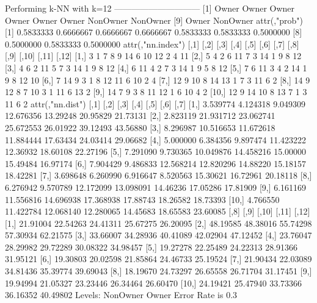 \documentclass{article}
\begin{document}
\begin{Schunk}
\begin{Soutput}
Performing k-NN with k=12
 ------------------------------
 [1] Owner    Owner    Owner    Owner    Owner    Owner    NonOwner NonOwner
 [9] Owner    NonOwner
attr(,"prob")
 [1] 0.5833333 0.6666667 0.6666667 0.6666667 0.5833333 0.5833333 0.5000000
 [8] 0.5000000 0.5833333 0.5000000
attr(,"nn.index")
      [,1] [,2] [,3] [,4] [,5] [,6] [,7] [,8] [,9] [,10] [,11] [,12]
 [1,]    3    1    7    8    9   14    6   10   12     2     4    11
 [2,]    5    4    2    6   11    7    3   14    1     9     8    12
 [3,]    4    6    2   11    5    7    3   14    1     9     8    12
 [4,]    6   11    4    2    7    3   14    1    9     5     8    12
 [5,]    7    6   11    3    4    2   14    1    9     8    12    10
 [6,]    7   14    9    3    1    8   12   11    6    10     2     4
 [7,]   12    9   10    8   14   13    1    7    3    11     6     2
 [8,]   14    9   12    8    7   10    3    1   11     6    13     2
 [9,]   14    7    9    3    8   11   12    1    6    10     4     2
[10,]   12    9   14   10    8   13    7    1    3    11     6     2
attr(,"nn.dist")
          [,1]      [,2]      [,3]      [,4]     [,5]     [,6]     [,7]
 [1,] 3.539774  4.124318  9.049309 12.676356 13.29248 20.95829 21.73131
 [2,] 2.823119 21.931712 23.062741 25.672553 26.01922 39.12493 43.56880
 [3,] 8.296987 10.516653 11.672618 11.884444 17.63434 24.03414 29.06682
 [4,] 5.000000  6.384356  9.897474 11.423222 12.36932 18.60108 22.27196
 [5,] 7.291090  9.730365 10.049876 14.458216 15.00000 15.49484 16.97174
 [6,] 7.904429  9.486833 12.568214 12.820296 14.88220 15.18157 18.42281
 [7,] 3.698648  6.260990  6.916647  8.520563 15.30621 16.72961 20.18118
 [8,] 6.276942  9.570789 12.172099 13.098091 14.46236 17.05286 17.81909
 [9,] 6.161169 11.556816 14.696938 17.368938 17.88743 18.26582 18.73393
[10,] 4.766550 11.422784 12.068140 12.280065 14.45683 18.65583 23.60085
          [,8]     [,9]    [,10]    [,11]    [,12]
 [1,] 21.91004 22.54263 24.41311 25.67275 26.20095
 [2,] 48.19585 48.38016 55.74298 57.30934 62.21575
 [3,] 33.66007 34.28936 40.41089 42.02904 47.12452
 [4,] 23.76047 28.29982 29.72289 30.08322 34.98457
 [5,] 19.27278 22.25489 24.22313 28.91366 31.95121
 [6,] 19.30803 20.02598 21.85864 24.46733 25.19524
 [7,] 21.90434 22.03089 34.81436 35.39774 39.69043
 [8,] 18.19670 24.73297 26.65558 26.71704 31.17451
 [9,] 19.94994 21.05327 23.23446 26.34464 26.60470
[10,] 24.19421 25.47940 33.73366 36.16352 40.49802
Levels: NonOwner Owner
Error Rate is  0.3


\end{Soutput}
\end{Schunk}
\end{document}

